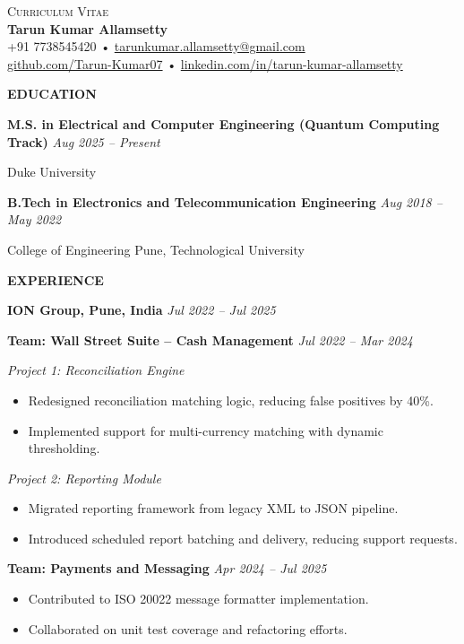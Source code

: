 \documentclass[a4paper,10pt]{article}
\newcommand{\cvHeaderOne}[1]{%
  \vspace*{1.2em}%
  {\noindent\large\textbf{\MakeUppercase{#1}}\par}%
  \vspace*{0.5em}%
}
\newcommand{\cvHeaderTwo}[2]{%
  \vspace{0.8em}%
  \noindent\textbf{\normalsize #1} \hfill \textit{#2}\par%
  \vspace{0.4em}%
}
\newcommand{\cvHeaderThree}[2]{%
  \noindent\textbf{\small #1} \hfill \textit{#2}\par%
  \vspace{0.2em}%
}
\newcommand{\cvHeaderFour}[1]{%
  \textit{#1}%
}
\newcommand{\cvItem}[1]{%
  \noindent\parbox{\dimexpr\linewidth}{#1}\par\vspace{0.4em}%
}
\newenvironment{cvItemList}{%
  \begin{itemize}%
    \setlength{\itemsep}{0.2em}%
    \setlength{\topsep}{0em}%
    \setlength{\partopsep}{0em}%
    \setlength{\parsep}{0em}%
    \setlength{\parskip}{0em}%
}{%
  \end{itemize}%
}
\begin{document}
\begin{center}
  {\large \textsc{Curriculum Vitae}} \\[0.3em]
  {\LARGE \textbf{Tarun Kumar Allamsetty}} \\[0.75em]
  \small
  +91 7738545420 \quad • \quad \href{mailto:tarunkumar.allamsetty@gmail.com}{tarunkumar.allamsetty@gmail.com} \\[0.2em]
  \href{https://github.com/Tarun-Kumar07}{github.com/Tarun-Kumar07} \quad • \quad
  \href{https://www.linkedin.com/in/tarun-kumar-allamsetty}{linkedin.com/in/tarun-kumar-allamsetty}
\end{center}

\vspace{2em}

\cvHeaderOne{Education}

\cvHeaderTwo{M.S. in Electrical and Computer Engineering (Quantum Computing Track)}{Aug 2025 -- Present}
\cvItem{Duke University}

\cvHeaderTwo{B.Tech in Electronics and Telecommunication Engineering}{Aug 2018 -- May 2022}
\cvItem{College of Engineering Pune, Technological University}

\cvHeaderOne{Experience}

\cvHeaderTwo{ION Group, Pune, India}{Jul 2022 -- Jul 2025}

\cvHeaderThree{Team: Wall Street Suite – Cash Management}{Jul 2022 -- Mar 2024}

\cvHeaderFour{Project 1: Reconciliation Engine}

\begin{cvItemList}
  \item Redesigned reconciliation matching logic, reducing false positives by 40\%.
  \item Implemented support for multi-currency matching with dynamic thresholding.
\end{cvItemList}

\cvHeaderFour{Project 2: Reporting Module}

\begin{cvItemList}
  \item Migrated reporting framework from legacy XML to JSON pipeline.
  \item Introduced scheduled report batching and delivery, reducing support requests.
\end{cvItemList}

\cvHeaderThree{Team: Payments and Messaging}{Apr 2024 -- Jul 2025}

\begin{cvItemList}
  \item Contributed to ISO 20022 message formatter implementation.
  \item Collaborated on unit test coverage and refactoring efforts.
\end{cvItemList}
\end{document}

